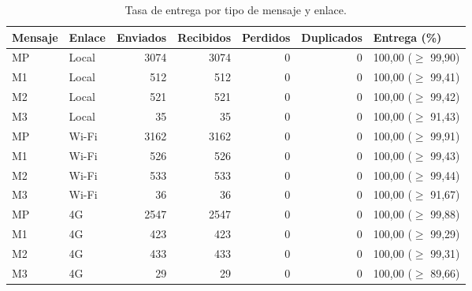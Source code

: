 \begin{table}[H]
\centering
\caption{Tasa de entrega por tipo de mensaje y enlace.}
\label{tab:entrega}
\small
\begin{tabular}{llrrrrl}
\toprule
\textbf{Mensaje} & \textbf{Enlace} & \textbf{Enviados} & \textbf{Recibidos} & \textbf{Perdidos} & \textbf{Duplicados} & \textbf{Entrega (\%)} \\
\midrule
MP & Local & 3074 & 3074 & 0 & 0 & 100,00 ($\geq$ 99,90) \\
M1 & Local & 512 & 512 & 0 & 0 & 100,00 ($\geq$ 99,41) \\
M2 & Local & 521 & 521 & 0 & 0 & 100,00 ($\geq$ 99,42) \\
M3 & Local & 35 & 35 & 0 & 0 & 100,00 ($\geq$ 91,43) \\
\addlinespace
MP & Wi-Fi & 3162 & 3162 & 0 & 0 & 100,00 ($\geq$ 99,91) \\
M1 & Wi-Fi & 526 & 526 & 0 & 0 & 100,00 ($\geq$ 99,43) \\
M2 & Wi-Fi & 533 & 533 & 0 & 0 & 100,00 ($\geq$ 99,44) \\
M3 & Wi-Fi & 36 & 36 & 0 & 0 & 100,00 ($\geq$ 91,67) \\
\addlinespace
MP & 4G & 2547 & 2547 & 0 & 0 & 100,00 ($\geq$ 99,88) \\
M1 & 4G & 423 & 423 & 0 & 0 & 100,00 ($\geq$ 99,29) \\
M2 & 4G & 433 & 433 & 0 & 0 & 100,00 ($\geq$ 99,31) \\
M3 & 4G & 29 & 29 & 0 & 0 & 100,00 ($\geq$ 89,66) \\
\bottomrule
\end{tabular}
\par{}
\end{table}
